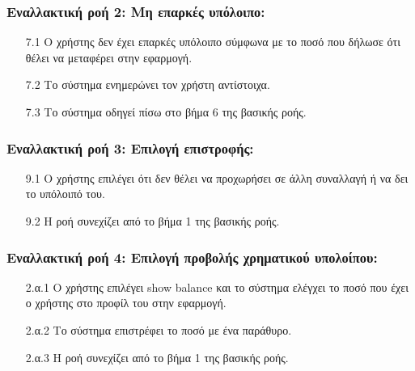 \documentclass[12pt,a4paper]{article}
\begin{document}
\subsubsection*{Εναλλακτική ροή 2: Μη επαρκές υπόλοιπο:}
\begin{enumerate}
    \item [7.1] Ο χρήστης δεν έχει επαρκές υπόλοιπο σύμφωνα με το ποσό που δήλωσε ότι θέλει να μεταφέρει στην εφαρμογή.
    \item [7.2] Το σύστημα ενημερώνει τον χρήστη αντίστοιχα.
    \item [7.3] Το σύστημα οδηγεί πίσω στο βήμα 6 της βασικής ροής.
\end{enumerate}

\subsubsection*{Εναλλακτική ροή 3: Επιλογή επιστροφής:}
\begin{enumerate}
    \item [9.1] Ο χρήστης επιλέγει ότι δεν θέλει να προχωρήσει σε άλλη συναλλαγή ή να δει το υπόλοιπό του.
    \item [9.2] Η ροή συνεχίζει από το βήμα 1 της βασικής ροής.
\end{enumerate}

\subsubsection*{Εναλλακτική ροή 4: Επιλογή προβολής χρηματικού υπολοίπου:}
\begin{enumerate}
    \item [2.α.1] Ο χρήστης επιλέγει show balance και το σύστημα ελέγχει το ποσό που έχει ο χρήστης στο προφίλ του στην εφαρμογή.
    \item [2.α.2] Το σύστημα επιστρέφει το ποσό με ένα παράθυρο.
    \item [2.α.3] Η ροή συνεχίζει από το βήμα 1 της βασικής ροής.
\end{enumerate}
\end{document}
